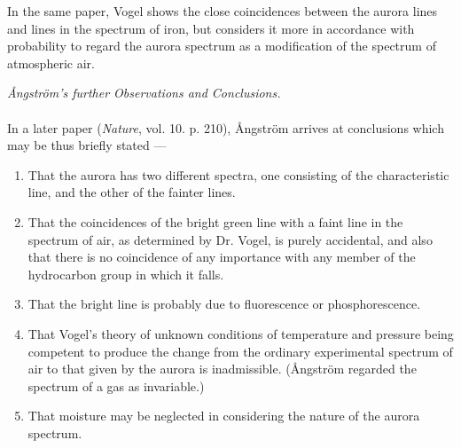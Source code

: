 \documentclass[a4paper, 12pt, oneside, polutonikogreek, english]{article}
\begin{document}
In the same paper, Vogel shows the close coincidences between the aurora lines and lines in the spectrum of iron, but considers it more in accordance with probability to regard the aurora spectrum as a modification of the spectrum of atmospheric air.
\begin{center}
\emph{Ångström's further Observations and Conclusions.}
\end{center}
\paragraph{}
In a later paper (\emph{Nature}, vol. 10. p. 210), Ångström arrives at conclusions which may be thus briefly stated ---
\begin{enumerate}
    \item That the aurora has two different spectra, one consisting of the characteristic line, and the other of the fainter lines.
    \item That the coincidences of the bright green line with a faint line in the spectrum of air, as determined by Dr. Vogel, is purely accidental, and also that there is no coincidence of any importance with any member of the hydrocarbon group in which it falls.
    \item That the bright line is probably due to fluorescence or phosphorescence.
    \item That Vogel's theory of unknown conditions of temperature and pressure being competent to produce the change from the ordinary experimental spectrum of air to that given by the aurora is inadmissible. (Ångström regarded the spectrum of a gas as invariable.)
    \item That moisture may be neglected in considering the nature of the aurora spectrum.
\end{enumerate}
\end{document}
